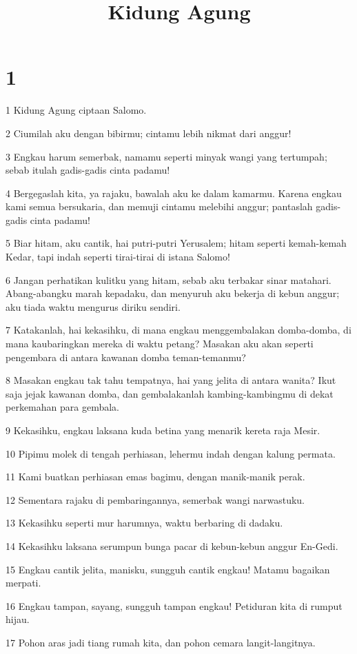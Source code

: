 

\title{Kidung Agung}


\chapter{1}

\par 1 Kidung Agung ciptaan Salomo.
\par 2 Ciumilah aku dengan bibirmu; cintamu lebih nikmat dari anggur!
\par 3 Engkau harum semerbak, namamu seperti minyak wangi yang tertumpah; sebab itulah gadis-gadis cinta padamu!
\par 4 Bergegaslah kita, ya rajaku, bawalah aku ke dalam kamarmu. Karena engkau kami semua bersukaria, dan memuji cintamu melebihi anggur; pantaslah gadis-gadis cinta padamu!
\par 5 Biar hitam, aku cantik, hai putri-putri Yerusalem; hitam seperti kemah-kemah Kedar, tapi indah seperti tirai-tirai di istana Salomo!
\par 6 Jangan perhatikan kulitku yang hitam, sebab aku terbakar sinar matahari. Abang-abangku marah kepadaku, dan menyuruh aku bekerja di kebun anggur; aku tiada waktu mengurus diriku sendiri.
\par 7 Katakanlah, hai kekasihku, di mana engkau menggembalakan domba-domba, di mana kaubaringkan mereka di waktu petang? Masakan aku akan seperti pengembara di antara kawanan domba teman-temanmu?
\par 8 Masakan engkau tak tahu tempatnya, hai yang jelita di antara wanita? Ikut saja jejak kawanan domba, dan gembalakanlah kambing-kambingmu di dekat perkemahan para gembala.
\par 9 Kekasihku, engkau laksana kuda betina yang menarik kereta raja Mesir.
\par 10 Pipimu molek di tengah perhiasan, lehermu indah dengan kalung permata.
\par 11 Kami buatkan perhiasan emas bagimu, dengan manik-manik perak.
\par 12 Sementara rajaku di pembaringannya, semerbak wangi narwastuku.
\par 13 Kekasihku seperti mur harumnya, waktu berbaring di dadaku.
\par 14 Kekasihku laksana serumpun bunga pacar di kebun-kebun anggur En-Gedi.
\par 15 Engkau cantik jelita, manisku, sungguh cantik engkau! Matamu bagaikan merpati.
\par 16 Engkau tampan, sayang, sungguh tampan engkau! Petiduran kita di rumput hijau.
\par 17 Pohon aras jadi tiang rumah kita, dan pohon cemara langit-langitnya.

